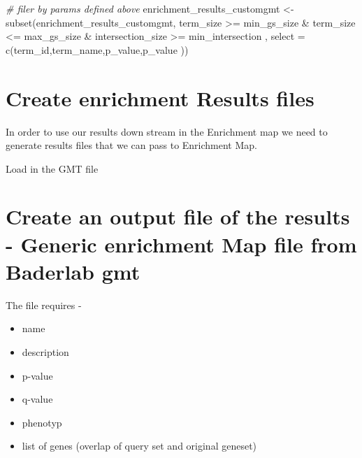 \documentclass[
]{book}
\newenvironment{Shaded}{\begin{snugshade}}{\end{snugshade}}
\newcommand{\AttributeTok}[1]{\textcolor[rgb]{0.77,0.63,0.00}{#1}}
\newcommand{\CommentTok}[1]{\textcolor[rgb]{0.56,0.35,0.01}{\textit{#1}}}
\newcommand{\FunctionTok}[1]{\textcolor[rgb]{0.00,0.00,0.00}{#1}}
\newcommand{\NormalTok}[1]{#1}
\newcommand{\OtherTok}[1]{\textcolor[rgb]{0.56,0.35,0.01}{#1}}
\newcommand{\SpecialCharTok}[1]{\textcolor[rgb]{0.00,0.00,0.00}{#1}}
\providecommand{\tightlist}{%
  \setlength{\itemsep}{0pt}\setlength{\parskip}{0pt}}
\begin{document}
\begin{Shaded}
\begin{Highlighting}[]
\CommentTok{\# filer by params defined above}
\NormalTok{enrichment\_results\_customgmt }\OtherTok{\textless{}{-}} \FunctionTok{subset}\NormalTok{(enrichment\_results\_customgmt,}
\NormalTok{                                       term\_size }\SpecialCharTok{\textgreater{}=}\NormalTok{ min\_gs\_size }\SpecialCharTok{\&} 
\NormalTok{                                   term\_size }\SpecialCharTok{\textless{}=}\NormalTok{ max\_gs\_size }\SpecialCharTok{\&} 
\NormalTok{                                   intersection\_size }\SpecialCharTok{\textgreater{}=}\NormalTok{ min\_intersection , }
                                 \AttributeTok{select =} \FunctionTok{c}\NormalTok{(term\_id,term\_name,p\_value,p\_value ))}
\end{Highlighting}
\end{Shaded}

\hypertarget{create-enrichment-results-files}{%
\section{Create enrichment Results files}\label{create-enrichment-results-files}}

In order to use our results down stream in the Enrichment map we need to generate results files that we can pass to Enrichment Map.

Load in the GMT file

\hypertarget{create-an-output-file-of-the-results---generic-enrichment-map-file-from-baderlab-gmt}{%
\section{Create an output file of the results - Generic enrichment Map file from Baderlab gmt}\label{create-an-output-file-of-the-results---generic-enrichment-map-file-from-baderlab-gmt}}

The file requires -

\begin{itemize}
\tightlist
\item
  name
\item
  description
\item
  p-value
\item
  q-value
\item
  phenotyp
\item
  list of genes (overlap of query set and original geneset)
\end{itemize}
\end{document}
